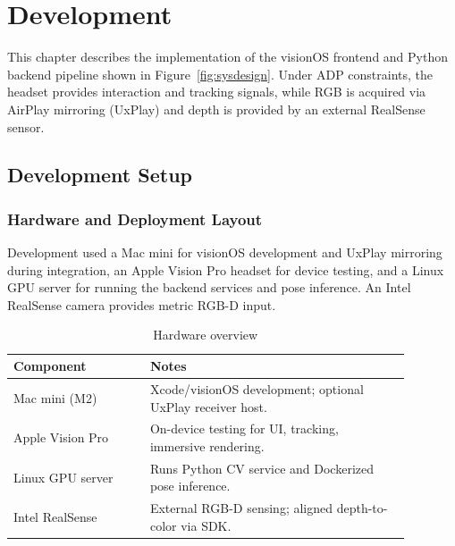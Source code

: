 \section{Development}
\label{sec:development}

This chapter describes the implementation of the visionOS frontend and Python backend pipeline shown in Figure~\ref{fig:sysdesign}. Under ADP constraints, the headset provides interaction and tracking signals, while RGB is acquired via AirPlay mirroring (UxPlay) and depth is provided by an external RealSense sensor.

\subsection{Development Setup}
\label{subsec:dev_setup}

\subsubsection{Hardware and Deployment Layout}

Development used a Mac mini for visionOS development and UxPlay mirroring during integration, an Apple Vision Pro headset for device testing, and a Linux GPU server for running the backend services and pose inference. An Intel RealSense camera provides metric RGB-D input.

\begin{table}[H]
    \centering
    \caption{Hardware overview}
    \label{tab:hw_overview_impl}
    \begin{tabular}{p{0.30\linewidth}p{0.58\linewidth}}
        \toprule
        \textbf{Component} & \textbf{Notes} \\
        \midrule
        Mac mini (M2) & Xcode/visionOS development; optional UxPlay receiver host. \\
        Apple Vision Pro & On-device testing for UI, tracking, immersive rendering. \\
        Linux GPU server & Runs Python CV service and Dockerized pose inference. \\
        Intel RealSense & External RGB-D sensing; aligned depth-to-color via SDK. \\
        \bottomrule
    \end{tabular}
\end{table}
